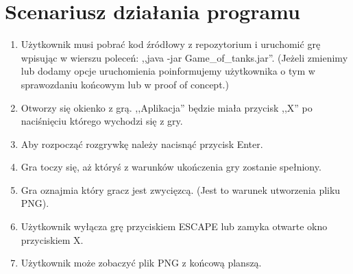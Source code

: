 \documentclass{article}
\begin{document}
\section{Scenariusz działania programu}
\begin{enumerate}

    \item Użytkownik musi pobrać kod źródłowy z repozytorium i uruchomić grę wpisując w wierszu poleceń: ,,java -jar Game\_of\_tanks.jar''. (Jeżeli zmienimy lub dodamy opcje uruchomienia poinformujemy użytkownika o tym w sprawozdaniu końcowym lub w proof of concept.)

    \item Otworzy się okienko z grą. ,,Aplikacja'' będzie miała przycisk ,,X'' po naciśnięciu którego wychodzi się z gry.

    \item Aby rozpocząć rozgrywkę należy nacisnąć przycisk Enter.
    
    \item Gra toczy się, aż któryś z warunków ukończenia gry zostanie spełniony.
    
    \item Gra oznajmia który gracz jest zwycięzcą. (Jest to warunek utworzenia pliku PNG).
    
    \item Użytkownik wyłącza grę przyciskiem ESCAPE lub zamyka otwarte okno przyciskiem X.
    
    \item Użytkownik może zobaczyć plik PNG z końcową planszą.
    
\end{enumerate}
\end{document}
